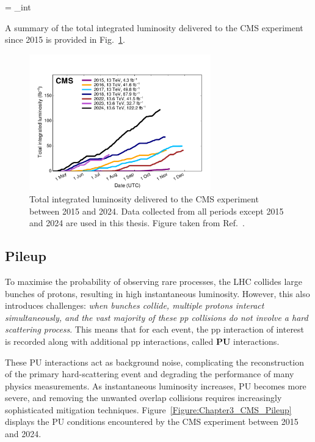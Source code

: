 \begin{equation_pad}
     = \sigma \cdot {}_{int}
\end{equation_pad}

A summary of the total integrated luminosity delivered to the \ac{CMS} experiment since 2015 is provided in Fig.~\ref{Figure:Chapter3_CMS_IntegratedLumi}.

\begin{figure}[!htbp]
\centering
\includegraphics[width= 0.7\textwidth]{Figures/Chapter3/CMS_IntegratedLumi.pdf}
\caption[Total integrated luminosity delivered to the \ac{CMS} experiment between 2015 and 2024]{Total integrated luminosity delivered to the \ac{CMS} experiment between 2015 and 2024. Data collected from all periods except 2015 and 2024 are used in this thesis. Figure taken from Ref.~\cite{CMS_IntegratedLumi}.}
\label{Figure:Chapter3_CMS_IntegratedLumi}
\end{figure}

\subsection{Pileup}

To maximise the probability of observing rare processes, the \ac{LHC} collides large bunches of protons, resulting in high instantaneous luminosity. However, this also introduces challenges: \textit{when bunches collide, multiple protons interact simultaneously, and the vast majority of these pp collisions do not involve a hard scattering process}. This means that for each event, the pp interaction of interest is recorded along with additional pp interactions, called \textbf{\ac{PU}} interactions. 

These \ac{PU} interactions act as background noise, complicating the reconstruction of the primary hard-scattering event and degrading the performance of many physics measurements. As instantaneous luminosity increases, \ac{PU} becomes more severe, and removing the unwanted overlap collisions requires increasingly sophisticated mitigation techniques. Figure~\ref{Figure:Chapter3_CMS_Pileup} displays the \ac{PU} conditions encountered by the \ac{CMS} experiment between 2015 and 2024.


